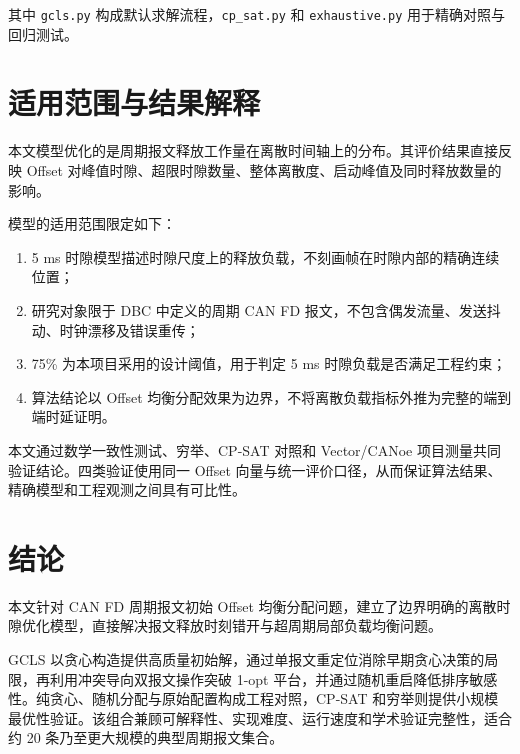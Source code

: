 \documentclass[UTF8,12pt,a4paper]{ctexart}
\begin{document}
其中 \texttt{gcls.py} 构成默认求解流程，\texttt{cp\_sat.py} 和 \texttt{exhaustive.py} 用于精确对照与回归测试。

\section{适用范围与结果解释}

本文模型优化的是周期报文释放工作量在离散时间轴上的分布。其评价结果直接反映 Offset 对峰值时隙、超限时隙数量、整体离散度、启动峰值及同时释放数量的影响。

模型的适用范围限定如下：

\begin{enumerate}
  \item 5 ms 时隙模型描述时隙尺度上的释放负载，不刻画帧在时隙内部的精确连续位置；
  \item 研究对象限于 DBC 中定义的周期 CAN FD 报文，不包含偶发流量、发送抖动、时钟漂移及错误重传；
  \item 75\% 为本项目采用的设计阈值，用于判定 5 ms 时隙负载是否满足工程约束；
  \item 算法结论以 Offset 均衡分配效果为边界，不将离散负载指标外推为完整的端到端时延证明。
\end{enumerate}

本文通过数学一致性测试、穷举、CP-SAT 对照和 Vector/CANoe 项目测量共同验证结论。四类验证使用同一 Offset 向量与统一评价口径，从而保证算法结果、精确模型和工程观测之间具有可比性。

\section{结论}

本文针对 CAN FD 周期报文初始 Offset 均衡分配问题，建立了边界明确的离散时隙优化模型，直接解决报文释放时刻错开与超周期局部负载均衡问题。

GCLS 以贪心构造提供高质量初始解，通过单报文重定位消除早期贪心决策的局限，再利用冲突导向双报文操作突破 1-opt 平台，并通过随机重启降低排序敏感性。纯贪心、随机分配与原始配置构成工程对照，CP-SAT 和穷举则提供小规模最优性验证。该组合兼顾可解释性、实现难度、运行速度和学术验证完整性，适合约 20 条乃至更大规模的典型周期报文集合。
\end{document}
